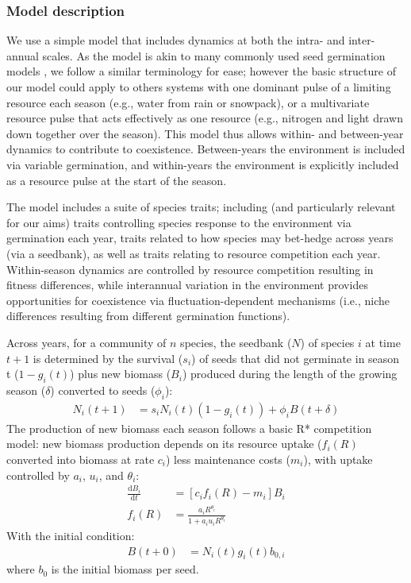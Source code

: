 \documentclass[11pt,letterpaper]{article}
\begin{document}
\subsubsection{Model description}
We use a simple model that includes dynamics at both the intra- and inter-annual scales. As the model is akin to many commonly used seed germination models \citep{Chesson:2004eo}, we follow a similar terminology for ease; however the basic structure of our model could apply to others systems with one dominant pulse of a limiting resource each season (e.g., water from rain or snowpack), or a multivariate resource pulse that acts effectively as one resource (e.g., nitrogen and light drawn down together over the season).  This model thus allows within- and between-year dynamics to contribute to coexistence. Between-years the environment is included via variable germination, and within-years the environment is explicitly included as a resource pulse at the start of the season. 

The model includes a suite of species traits; including (and particularly relevant for our aims) traits controlling species response to the environment via germination each year, traits related to how species may bet-hedge across years (via a seedbank), as well as traits relating to resource competition each year. Within-season dynamics are controlled by resource competition resulting in fitness differences, while interannual variation in the environment provides opportunities for coexistence via fluctuation-dependent mechanisms (i.e., niche differences resulting from different germination functions). 

Across years, for a community of \(n\) species, the seedbank ($N$) of species $i$ at time $t+1$ is determined by the survival ($s_i$) of seeds that did not germinate in season t ($1-g_{i}(t)$) plus new biomass ($B_i$) produced during the length of the  growing season ($\delta$) converted to seeds ($\phi_i$):
\begin{align}
N_{i}(t+1) & =
s_{i}N_{i}(t)(1-g_{i}(t))+\phi_{i}B(t+\delta)
\end{align}
The production of new biomass each season follows a basic R* competition model: new biomass production depends on its resource uptake ($f_i(R)$ converted into biomass at rate $c_i$) less maintenance costs ($m_i$), with uptake controlled by $a_i$, $u_i$, and $\theta_i$:
\begin{align}
\frac{\mathrm{d}B_i}{\mathrm{d}t} & = [c_{i}f_{i}(R) - m_{i}]B_{i} \\
f_{i}(R) & = \frac{a_{i}R^{\theta_{i}}}{1+a_{i}u_{i}R^{\theta_{i}}}
\end{align}
With the initial condition:
\begin{align}
B(t+0) & = N_{i}(t)g_{i}(t)b_{0,i}
\end{align}
where $b_{0}$ is the initial biomass per seed.
\end{document}
